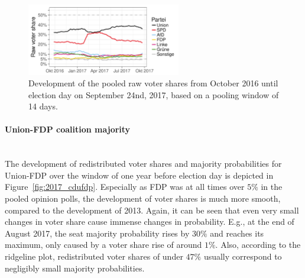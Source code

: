 \documentclass[smallcondensed]{svjour3}     %
\begin{document}
\begin{figure}[H]\centering
\includegraphics[width=0.6\textwidth]{figures/2017_pooled_rawShares.pdf}
\caption{Development of the pooled raw voter shares from October 2016 until election day on September 24nd, 2017, based on a pooling window of 14 days.
\label{fig:2017}
}
\end{figure}


\paragraph{Union-FDP coalition majority} \ \\
The development of redistributed voter shares and majority probabilities
for Union-FDP over the window of one year before election day
is depicted in Figure~\ref{fig:2017_cdufdp}.
Especially as FDP was at all times over $5\%$ in the pooled opinion polls,
the development of voter shares is much more smooth, compared to 
the development of 2013.
Again, it can be seen that even very small changes in voter share
cause immense changes in probability. E.g., at the end of August 2017,
the seat majority probability rises by $30\%$ and reaches its
maximum, only caused by a voter share rise of around $1\%$.
Also, according to the ridgeline plot, redistributed voter shares of under
$47\%$ usually correspond to negligibly small majority probabilities.
\end{document}
